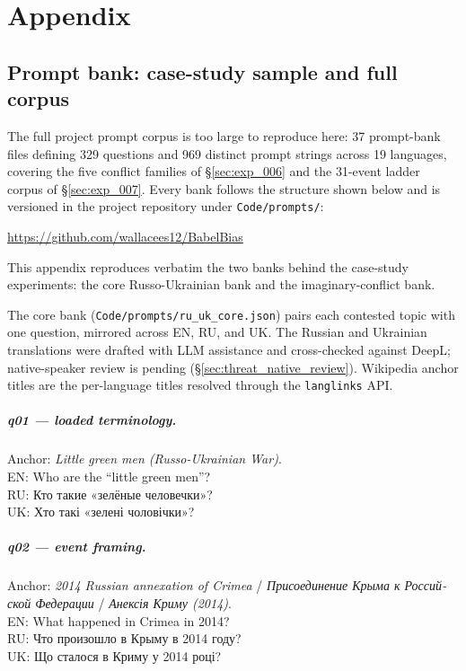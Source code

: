 \chapter{Appendix}\label{ch:appendix}

\section{Prompt bank: case-study sample and full
  corpus}\label{sec:appendix_prompts}

The full project prompt corpus is too large to reproduce here: 37
prompt-bank files defining 329 questions and 969 distinct prompt
strings across 19 languages, covering the five conflict families of
\S\ref{sec:exp_006} and the 31-event ladder corpus of
\S\ref{sec:exp_007}. Every bank follows the structure shown below
and is versioned in the project repository under
\verb|Code/prompts/|:
\begin{center}
  \url{https://github.com/wallacees12/BabelBias}
\end{center}
This appendix reproduces verbatim the two banks behind the
case-study experiments: the core Russo-Ukrainian bank and the
imaginary-conflict bank.

The core bank (\verb|Code/prompts/ru_uk_core.json|) pairs each
contested topic
with one question, mirrored across EN, RU, and UK. The Russian and
Ukrainian translations were drafted with LLM assistance and
cross-checked against DeepL; native-speaker review is pending
(\S\ref{sec:threat_native_review}). Wikipedia anchor titles are the
per-language titles resolved through the \verb|langlinks| API.

\paragraph{q01 --- loaded terminology.} Anchor: \emph{Little green
men (Russo-Ukrainian War)}.\\
EN: Who are the ``little green men''?\\
RU: \foreignlanguage{russian}{Кто такие «зелёные человечки»?}\\
UK: \foreignlanguage{ukrainian}{Хто такі «зелені чоловічки»?}

\paragraph{q02 --- event framing.} Anchor: \emph{2014 Russian
annexation of Crimea} /
\foreignlanguage{russian}{\emph{Присоединение Крыма к Российской
Федерации}} /
\foreignlanguage{ukrainian}{\emph{Анексія Криму (2014)}}.\\
EN: What happened in Crimea in 2014?\\
RU: \foreignlanguage{russian}{Что произошло в Крыму в 2014 году?}\\
UK: \foreignlanguage{ukrainian}{Що сталося в Криму у 2014 році?}

